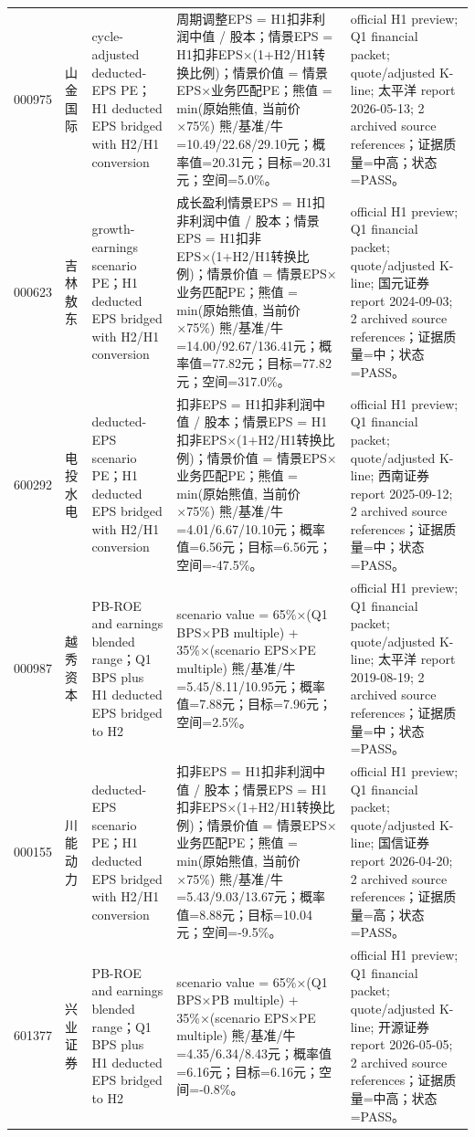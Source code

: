 \begin{longtable}{L{0.85cm}L{1.55cm}L{2.25cm}L{6.0cm}L{4.0cm}}
000975 & 山金国际 & cycle-adjusted deducted-EPS PE；H1 deducted EPS bridged with H2/H1 conversion & 周期调整EPS = H1扣非利润中值 / 股本；情景EPS = H1扣非EPS×(1+H2/H1转换比例)；情景价值 = 情景EPS×业务匹配PE；熊值 = min(原始熊值, 当前价×75\%) 熊/基准/牛=10.49/22.68/29.10元；概率值=20.31元；目标=20.31元；空间=5.0\%。 & official H1 preview; Q1 financial packet; quote/adjusted K-line; 太平洋 report 2026-05-13; 2 archived source references；证据质量=中高；状态=PASS。 \\
000623 & 吉林敖东 & growth-earnings scenario PE；H1 deducted EPS bridged with H2/H1 conversion & 成长盈利情景EPS = H1扣非利润中值 / 股本；情景EPS = H1扣非EPS×(1+H2/H1转换比例)；情景价值 = 情景EPS×业务匹配PE；熊值 = min(原始熊值, 当前价×75\%) 熊/基准/牛=14.00/92.67/136.41元；概率值=77.82元；目标=77.82元；空间=317.0\%。 & official H1 preview; Q1 financial packet; quote/adjusted K-line; 国元证券 report 2024-09-03; 2 archived source references；证据质量=中；状态=PASS。 \\
600292 & 电投水电 & deducted-EPS scenario PE；H1 deducted EPS bridged with H2/H1 conversion & 扣非EPS = H1扣非利润中值 / 股本；情景EPS = H1扣非EPS×(1+H2/H1转换比例)；情景价值 = 情景EPS×业务匹配PE；熊值 = min(原始熊值, 当前价×75\%) 熊/基准/牛=4.01/6.67/10.10元；概率值=6.56元；目标=6.56元；空间=-47.5\%。 & official H1 preview; Q1 financial packet; quote/adjusted K-line; 西南证券 report 2025-09-12; 2 archived source references；证据质量=中；状态=PASS。 \\
000987 & 越秀资本 & PB-ROE and earnings blended range；Q1 BPS plus H1 deducted EPS bridged to H2 & scenario value = 65\%×(Q1 BPS×PB multiple) + 35\%×(scenario EPS×PE multiple) 熊/基准/牛=5.45/8.11/10.95元；概率值=7.88元；目标=7.96元；空间=2.5\%。 & official H1 preview; Q1 financial packet; quote/adjusted K-line; 太平洋 report 2019-08-19; 2 archived source references；证据质量=中；状态=PASS。 \\
000155 & 川能动力 & deducted-EPS scenario PE；H1 deducted EPS bridged with H2/H1 conversion & 扣非EPS = H1扣非利润中值 / 股本；情景EPS = H1扣非EPS×(1+H2/H1转换比例)；情景价值 = 情景EPS×业务匹配PE；熊值 = min(原始熊值, 当前价×75\%) 熊/基准/牛=5.43/9.03/13.67元；概率值=8.88元；目标=10.04元；空间=-9.5\%。 & official H1 preview; Q1 financial packet; quote/adjusted K-line; 国信证券 report 2026-04-20; 2 archived source references；证据质量=高；状态=PASS。 \\
601377 & 兴业证券 & PB-ROE and earnings blended range；Q1 BPS plus H1 deducted EPS bridged to H2 & scenario value = 65\%×(Q1 BPS×PB multiple) + 35\%×(scenario EPS×PE multiple) 熊/基准/牛=4.35/6.34/8.43元；概率值=6.16元；目标=6.16元；空间=-0.8\%。 & official H1 preview; Q1 financial packet; quote/adjusted K-line; 开源证券 report 2026-05-05; 2 archived source references；证据质量=中高；状态=PASS。 \\

\end{longtable}
